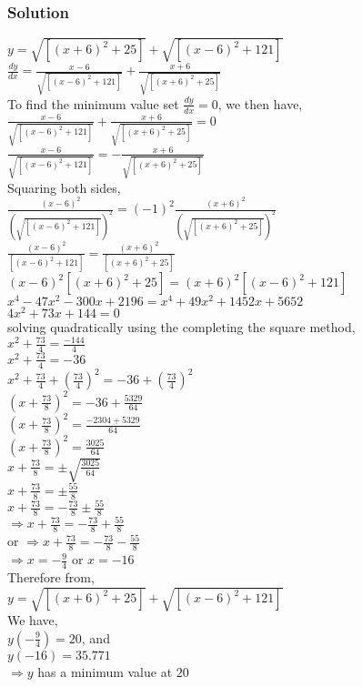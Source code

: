 \documentclass{article}
\begin{document}
\subsubsection{Solution}
 $ \displaystyle y=\sqrt{[(x+6)^{2}+25]}+\sqrt{[(x-6)^{2}+121]}$ \\
 $\displaystyle \frac{dy}{dx}= \frac{x-6}{\sqrt{[(x-6)^{2}+121]}}+\frac{x+6}{\sqrt{[(x+6)^{2}+25]}} $\\
 To find the minimum value set $\frac{dy}{dx}=0$, we then have,\\
 $ \displaystyle\frac{x-6}{\sqrt{[(x-6)^{2}+121]}}+\frac{x+6}{\sqrt{[(x+6)^{2}+25]}}=0 $ \\
 $ \displaystyle \frac{x-6}{\sqrt{[(x-6)^{2}+121]}}= - \frac{x+6}{\sqrt{[(x+6)^{2}+25]}} $ \\
 Squaring both sides,\\
  $ \displaystyle \frac{(x-6)^{2}}{(\sqrt{[(x-6)^{2}+121]})^{2}}=(-1)^{2} \frac{(x+6)^{2}}{(\sqrt{[(x+6)^{2}+25]})^{2}} $ \\
  $ \displaystyle \frac{(x-6)^{2}}{[(x-6)^{2}+121]}= \frac{(x+6)^{2}}{[(x+6)^{2}+25]} $ \\
 $ \displaystyle (x-6)^{2}[(x+6)^{2}+25]=(x+6)^{2}[(x-6)^{2}+121]$ \\
 $ \displaystyle x^{4}-47x^{2}-300x+2196=x^{4}+49x^{2}+1452x+5652 $\\
 $ \displaystyle 4x^{2}+73x+144=0$\\
 solving quadratically using the completing the square method,\\
  $ \displaystyle x^{2}+ \frac{73}{4}= \frac{-144}{4}$\\
$\displaystyle x^{2}+ \frac{73}{4}=-36 $\\
$\displaystyle x^{2}+ \frac{73}{4}+ \left(\frac{73}{4} \right)^{2}= -36+\left(\frac{73}{4}\right)^{2}$\\
$\displaystyle \left(x+ \frac{73}{8}\right)^{2}=-36+ \frac{5329}{64}$ \\
$\displaystyle \left(x+ \frac{73}{8}\right)^{2}= \frac{-2304+5329}{64}$ \\
$\displaystyle \left(x+ \frac{73}{8}\right)^{2}= \frac{3025}{64}$ \\
$\displaystyle x+ \frac{73}{8}= \pm \sqrt{\frac{3025}{64}} $ \\
$\displaystyle x+ \frac{73}{8}= \pm \frac{55}{8} $ \\

$\displaystyle x+ \frac{73}{8}= -\frac{73}{8} \pm \frac{55}{8} $ \\
$\displaystyle \Rightarrow  x+ \frac{73}{8}= -\frac{73}{8} + \frac{55}{8} $ \\
or $\displaystyle \Rightarrow  x+ \frac{73}{8}= -\frac{73}{8} - \frac{55}{8}$\\
$\displaystyle \Rightarrow x= -\frac{9}{4}$ or $x=-16$\\ 
Therefore from,\\
$\displaystyle y=\sqrt{[(x+6)^{2}+25]}+\sqrt{[(x-6)^{2}+121]}$\\
We have, \\
$\displaystyle y\left(-\frac{9}{4}\right)=20$, and\\
$\displaystyle y(-16)=35.771$\\
$\Rightarrow y$ has a minimum value at $20$\\
\end{document}
